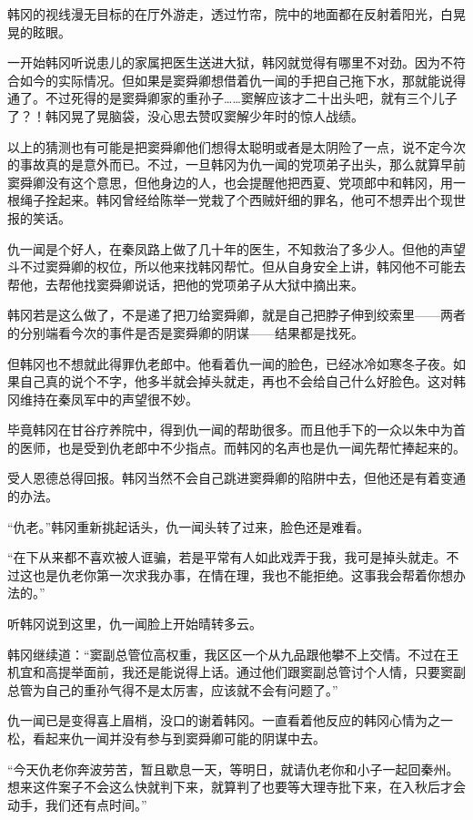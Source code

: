 韩冈的视线漫无目标的在厅外游走，透过竹帘，院中的地面都在反射着阳光，白晃晃的眩眼。

一开始韩冈听说患儿的家属把医生送进大狱，韩冈就觉得有哪里不对劲。因为不符合如今的实际情况。但如果是窦舜卿想借着仇一闻的手把自己拖下水，那就能说得通了。不过死得的是窦舜卿家的重孙子……窦解应该才二十出头吧，就有三个儿子了？！韩冈晃了晃脑袋，没心思去赞叹窦解少年时的惊人战绩。

以上的猜测也有可能是把窦舜卿他们想得太聪明或者是太阴险了一点，说不定今次的事故真的是意外而已。不过，一旦韩冈为仇一闻的党项弟子出头，那么就算早前窦舜卿没有这个意思，但他身边的人，也会提醒他把西夏、党项郎中和韩冈，用一根绳子拴起来。韩冈曾经给陈举一党栽了个西贼奸细的罪名，他可不想弄出个现世报的笑话。

仇一闻是个好人，在秦凤路上做了几十年的医生，不知救治了多少人。但他的声望斗不过窦舜卿的权位，所以他来找韩冈帮忙。但从自身安全上讲，韩冈他不可能去帮他，去帮他找窦舜卿说话，把他的党项弟子从大狱中摘出来。

韩冈若是这么做了，不是递了把刀给窦舜卿，就是自己把脖子伸到绞索里——两者的分别端看今次的事件是否是窦舜卿的阴谋——结果都是找死。

但韩冈也不想就此得罪仇老郎中。他看着仇一闻的脸色，已经冰冷如寒冬子夜。如果自己真的说个不字，他多半就会掉头就走，再也不会给自己什么好脸色。这对韩冈维持在秦凤军中的声望很不妙。

毕竟韩冈在甘谷疗养院中，得到仇一闻的帮助很多。而且他手下的一众以朱中为首的医师，也是受到仇老郎中不少指点。而韩冈的名声也是仇一闻先帮忙捧起来的。

受人恩德总得回报。韩冈当然不会自己跳进窦舜卿的陷阱中去，但他还是有着变通的办法。

“仇老。”韩冈重新挑起话头，仇一闻头转了过来，脸色还是难看。

“在下从来都不喜欢被人诓骗，若是平常有人如此戏弄于我，我可是掉头就走。不过这也是仇老你第一次求我办事，在情在理，我也不能拒绝。这事我会帮着你想办法的。”

听韩冈说到这里，仇一闻脸上开始晴转多云。

韩冈继续道：“窦副总管位高权重，我区区一个从九品跟他攀不上交情。不过在王机宜和高提举面前，我还是能说得上话。通过他们跟窦副总管讨个人情，只要窦副总管为自己的重孙气得不是太厉害，应该就不会有问题了。”

仇一闻已是变得喜上眉梢，没口的谢着韩冈。一直看着他反应的韩冈心情为之一松，看起来仇一闻并没有参与到窦舜卿可能的阴谋中去。

“今天仇老你奔波劳苦，暂且歇息一天，等明日，就请仇老你和小子一起回秦州。想来这件案子不会这么快就判下来，就算判了也要等大理寺批下来，在入秋后才会动手，我们还有点时间。”

